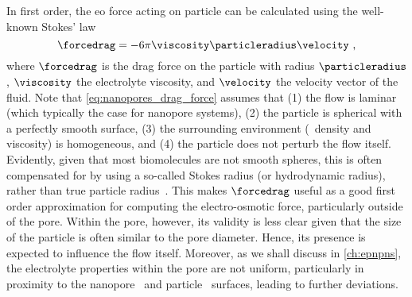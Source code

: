 In first order, the \gls{eo} force acting on particle can be calculated using the well-known Stokes' law
%
\begin{equation}\label{eq:nanopores_drag_force}
  \forcedrag = - 6 \pi \viscosity \particleradius \velocity
  \text{ ,}
\end{equation}
%
where $\forcedrag$ is the drag force on the particle with radius $\particleradius$, $\viscosity$ the
electrolyte viscosity, and $\velocity$ the velocity vector of the fluid. Note that
\cref{eq:nanopores_drag_force} assumes that (1) the flow is laminar (which typically the case for nanopore
systems\footnotemark), %
%
%
%
(2) the particle is spherical with a perfectly smooth surface, (3) the surrounding environment (\ie~density
and viscosity) is homogeneous, and (4) the particle does not perturb the flow itself. Evidently, given that
most biomolecules are not smooth spheres, this is often compensated for by using a so-called Stokes radius (or
hydrodynamic radius), rather than true particle radius~\cite{Ortega-2011}. This makes $\forcedrag$ useful as a
good first order approximation for computing the electro-osmotic force, particularly outside of the pore.
Within the pore, however, its validity is less clear given that the size of the particle is often similar to
the pore diameter. Hence, its presence is expected to influence the flow itself. Moreover, as we shall discuss
in \cref{ch:epnpns}, the electrolyte properties within the pore are not uniform, particularly in proximity to
the nanopore~\cite{Qiao-Aluru-2003,Vo-2016,Hsu-2017,Ye-2011} and particle~\cite{Pronk-2014,Makarov-1998}
surfaces, leading to further deviations.

